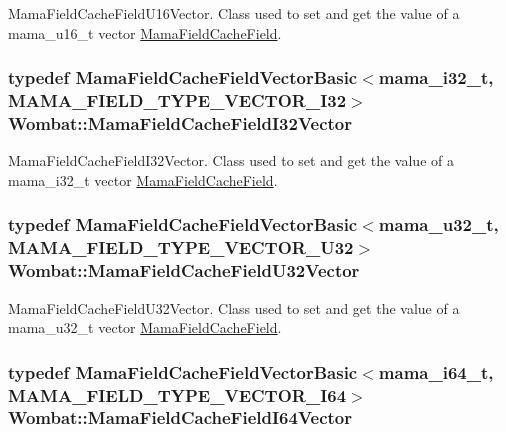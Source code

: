 MamaFieldCacheFieldU16Vector. Class used to set and get the value of a mama\_\-u16\_\-t vector {\ttfamily \hyperlink{classWombat_1_1MamaFieldCacheField}{MamaFieldCacheField}}. \hypertarget{namespaceWombat_a0b59c4c34e4db14cf46469f100419f08}{
\subsubsection[{MamaFieldCacheFieldI32Vector}]{\setlength{\rightskip}{0pt plus 5cm}typedef {\bf MamaFieldCacheFieldVectorBasic}$<$mama\_\-i32\_\-t, MAMA\_\-FIELD\_\-TYPE\_\-VECTOR\_\-I32$>$ {\bf Wombat::MamaFieldCacheFieldI32Vector}}}
\label{namespaceWombat_a0b59c4c34e4db14cf46469f100419f08}


MamaFieldCacheFieldI32Vector. Class used to set and get the value of a mama\_\-i32\_\-t vector {\ttfamily \hyperlink{classWombat_1_1MamaFieldCacheField}{MamaFieldCacheField}}. \hypertarget{namespaceWombat_a39fdf1473fa12cd354e77e7e8b3384c0}{
\subsubsection[{MamaFieldCacheFieldU32Vector}]{\setlength{\rightskip}{0pt plus 5cm}typedef {\bf MamaFieldCacheFieldVectorBasic}$<$mama\_\-u32\_\-t, MAMA\_\-FIELD\_\-TYPE\_\-VECTOR\_\-U32$>$ {\bf Wombat::MamaFieldCacheFieldU32Vector}}}
\label{namespaceWombat_a39fdf1473fa12cd354e77e7e8b3384c0}


MamaFieldCacheFieldU32Vector. Class used to set and get the value of a mama\_\-u32\_\-t vector {\ttfamily \hyperlink{classWombat_1_1MamaFieldCacheField}{MamaFieldCacheField}}. \hypertarget{namespaceWombat_ae3aad400fe294834eaf5cf5712de639f}{
\subsubsection[{MamaFieldCacheFieldI64Vector}]{\setlength{\rightskip}{0pt plus 5cm}typedef {\bf MamaFieldCacheFieldVectorBasic}$<$mama\_\-i64\_\-t, MAMA\_\-FIELD\_\-TYPE\_\-VECTOR\_\-I64$>$ {\bf Wombat::MamaFieldCacheFieldI64Vector}}}
\label{namespaceWombat_ae3aad400fe294834eaf5cf5712de639f}


